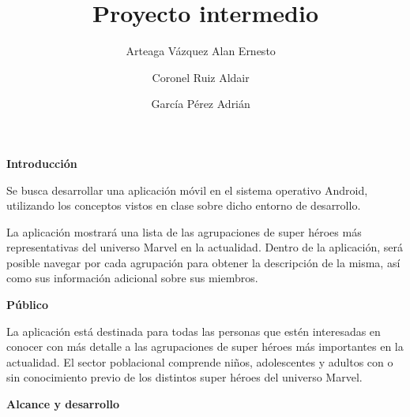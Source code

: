 \documentclass[11pt]{report}
\begin{document}
{}
\title{Proyecto intermedio}
\author{
  Arteaga Vázquez Alan Ernesto \
  \and
  Coronel Ruiz Aldair \
  \and
  García Pérez Adrián \
}\date{}
\maketitle

\textbf{Introducción} \

Se busca desarrollar una aplicación móvil en el sistema operativo
Android, utilizando los conceptos vistos en clase sobre dicho entorno
de desarrollo.

La aplicación mostrará una lista de las agrupaciones de super
héroes más representativas del universo Marvel en la actualidad.
Dentro de la aplicación, será posible navegar por cada agrupación para obtener
la descripción de la misma, así como sus información adicional sobre
sus miembros. \

\textbf{Público} \

La aplicación está destinada para todas las personas que estén interesadas
en conocer con más detalle a las agrupaciones de super héroes más importantes
en la actualidad. El sector poblacional comprende niños, adolescentes y adultos
con o sin conocimiento previo de los distintos super héroes del universo Marvel. \

\textbf{Alcance y desarrollo} \
\end{document}
